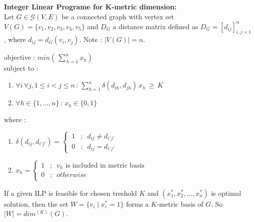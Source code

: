 \documentclass[12pt]{amsart}
\theoremstyle{plain}
\begin{document}
\begin{mdframed}[backgroundcolor=color_blue_1!10, linecolor=color_blue_2, linewidth=2pt, roundcorner=10pt, innertopmargin=10pt, innerbottommargin=10pt, skipabove=5pt, skipbelow=5pt]
  \textbf{Integer Linear Programe for K-metric dimension:} \\[3pt]
  Let $ G \in \mathcal{G}(V,E)$ be a connected graph with vertex set $ V(G) = \{v_1, v_2, v_3, v_4, v_5 \} $ and $D_G$ a distance matrix defined as $ D_G = [d_{ij}]_{i,j = 1}^{n}$, where $d_{ij} = d_G(v_i, v_j)$. Note : $ |V(G)| = n $.

  objective : $ \textit{min} \left( \, \sum\limits_{\, h=1}^{n} x_h \right)$ \\
  subject to :
  \begin{enumerate}

    \item \quad
      $
      \forall i \, \forall j , 1 \leq i < j \leq n \, : \, \sum\limits_{h=1}^{n} \delta(d_{ih}, d_{jh}) \, x_h \, \geq \, K
      $
    \item \quad
      $
      \forall h \in \{1, \ldots, n \} \, : \, x_h \in \{0,1 \}
      $
  \end{enumerate}
  where :
  \begin{enumerate}
    \item \quad
      $
      \delta(d_{ij}, d_{i'j'}) =
      \begin{cases}
        \, 1 & \! ; \, \, \, d_{ij} \neq d_{i'j'} \\
        \, 0 & \! ; \, \, \, d_{ij} = d_{i'j'}
      \end{cases}
      $
    \item \quad
      $
      x_h =
      \begin{cases}
        1 & \! ; \, \, \, v_h \, \, \text{is included in metric basis} \\
        0 & \! ; \, \, \, otherwise
      \end{cases}
      $
  \end{enumerate}

  \vspace{0.2cm}

  If a given ILP is feasible for chosen treshold $K$ and $(x_1^*, x_2^*, \ldots, x_n^* )$ is optimal solution, then the set $ W = \{v_i \mid x_i^* = 1\} $ forms a $K$-metric basis of $G$. So $|W| = dim^{(K)}(G)$.
\end{mdframed}

\vspace{0.1cm}
\end{document}
